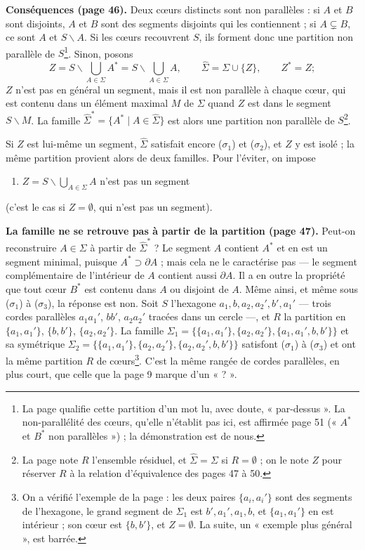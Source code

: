 \documentclass[11pt,a4paper]{article}
\begin{document}
\textbf{Conséquences (page 46).} Deux cœurs distincts sont non parallèles :
si $A$ et $B$ sont disjoints, $A$ et $B$ sont des segments disjoints qui les
contiennent ; si $A \subsetneq B$, ce sont $A$ et $S \smallsetminus A$. Si les
cœurs recouvrent $S$, ils forment donc une partition non parallèle de
$S$\footnote{La page qualifie cette partition d'un mot lu, avec doute,
« par-dessus ». La non-parallélité des cœurs, qu'elle n'établit pas ici,
est affirmée page 51 (« $A^{*}$ et $B^{*}$ non parallèles ») ; la
démonstration est de nous.}. Sinon, posons
\[
Z = S \smallsetminus \bigcup_{A \in \Sigma} A^{*} = S \smallsetminus
\bigcup_{A \in \Sigma} A, \qquad \widehat{\Sigma} = \Sigma \cup \{Z\},
\qquad Z^{*} = Z ;
\]
$Z$ n'est pas en général un segment, mais il est non parallèle à chaque
cœur, qui est contenu dans un élément maximal $M$ de $\Sigma$ quand $Z$ est
dans le segment $S \smallsetminus M$. La famille $\widehat{\Sigma}^{*} =
\{A^{*} \mid A \in \widehat{\Sigma}\}$ est alors une partition non parallèle
de $S$\footnote{La page note $R$ l'ensemble résiduel, et $\widehat{\Sigma} =
\Sigma$ si $R = \emptyset$ ; on le note $Z$ pour réserver $R$ à la relation
d'équivalence des pages 47 à 50.}.

Si $Z$ est lui-même un segment, $\widehat{\Sigma}$ satisfait encore
($\sigma_1$) et ($\sigma_2$), et $Z$ y est isolé ; la même partition provient
alors de deux familles. Pour l'éviter, on impose
\begin{enumerate}
  \item[($\sigma_3$)] $Z = S \smallsetminus \bigcup_{A \in \Sigma} A$ n'est
  pas un segment
\end{enumerate}
(c'est le cas si $Z = \emptyset$, qui n'est pas un segment).

\textbf{La famille ne se retrouve pas à partir de la partition (page 47).}
Peut-on reconstruire $A \in \Sigma$ à partir de $\widehat{\Sigma}^{*}$ ? Le
segment $A$ contient $A^{*}$ et en est un segment minimal, puisque $A^{*}
\supset \partial A$ ; mais cela ne le caractérise pas --- le segment
complémentaire de l'intérieur de $A$ contient aussi $\partial A$. Il a en
outre la propriété que tout cœur $B^{*}$ est contenu dans $A$ ou disjoint de
$A$. Même ainsi, et même sous ($\sigma_1$) à ($\sigma_3$), la réponse est
non. Soit $S$ l'hexagone $a_1, b, a_2, a_2', b', a_1'$ --- trois cordes
parallèles $a_1 a_1'$, $b b'$, $a_2 a_2'$ tracées dans un cercle ---, et $R$
la partition en $\{a_1, a_1'\}$, $\{b, b'\}$, $\{a_2, a_2'\}$. La famille
$\Sigma_1 = \{\{a_1, a_1'\}, \{a_2, a_2'\}, \{a_1, a_1', b, b'\}\}$ et sa
symétrique $\Sigma_2 = \{\{a_1, a_1'\}, \{a_2, a_2'\}, \{a_2, a_2', b, b'\}\}$
satisfont ($\sigma_1$) à ($\sigma_3$) et ont la même partition $R$ de
cœurs\footnote{On a vérifié l'exemple de la page : les deux paires $\{a_i,
a_i'\}$ sont des segments de l'hexagone, le grand segment de $\Sigma_1$ est
$b', a_1', a_1, b$, et $\{a_1, a_1'\}$ en est intérieur ; son cœur est $\{b,
b'\}$, et $Z = \emptyset$. La suite, un « exemple plus général », est
barrée.}. C'est la même rangée de cordes parallèles, en plus court, que celle
que la page 9 marque d'un « ? ».
\end{document}
